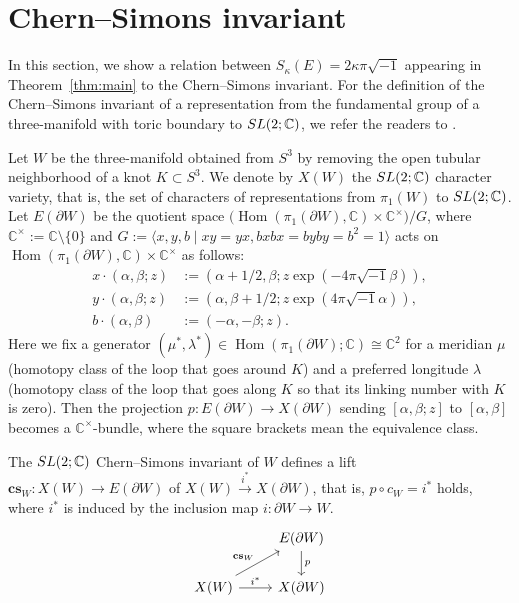 \documentclass[a4paper,dvipdfmx]{amsart}
\theoremstyle{plain}
\theoremstyle{definition}
\theoremstyle{remark}
\newcommand{\C}{\mathbb{C}}
\newcommand{\Hom}{\operatorname{Hom}}
\newcommand{\cs}{\mathbf{cs}}
\newcommand{\SL}{\rm{SL}}
\renewcommand{\i}{\sqrt{-1}}
\numberwithin{equation}{section}
\begin{document}
\section{Chern--Simons invariant}\label{sec:CS}
In this section, we show a relation between $S_{\kappa}(E)=2\kappa\pi\i$ appearing in Theorem~\ref{thm:main} to the Chern--Simons invariant.
For the definition of the Chern--Simons invariant of a representation from the fundamental group of a three-manifold with toric boundary to $\SL(2;\C)$, we refer the readers to \cite{Kirk/Klassen:COMMP1993}.
\par
Let $W$ be the three-manifold obtained from $S^3$ by removing the open tubular neighborhood of a knot $K\subset{S^3}$.
We denote by $X(W)$ the $\SL(2;\C)$ character variety, that is, the set of characters of representations from $\pi_1(W)$ to $\SL(2;\C)$.
Let $E(\partial{W})$ be the quotient space $\bigl(\Hom(\pi_1(\partial{W}),\C)\times\C^{\times}\bigr)/G$, where $\C^{\times}:=\C\setminus\{0\}$ and $G:=\langle x,y,b\mid xy=yx,bxbx=byby=b^2=1\rangle$ acts on $\Hom(\pi_1(\partial{W}),\C)\times\C^{\times}$ as follows:
\begin{equation}\label{eq:G_action}
\begin{split}
  x\cdot(\alpha,\beta;z)
  &:=
  (\alpha+1/2,\beta;z\exp(-4\pi\i\beta)),
  \\
  y\cdot(\alpha,\beta;z)
  &:=
  (\alpha,\beta+1/2;z\exp(4\pi\i\alpha)),
  \\
  b\cdot(\alpha,\beta)
  &:=
  (-\alpha,-\beta;z).
\end{split}
\end{equation}
Here we fix a generator $(\mu^{\ast},\lambda^{\ast})\in\Hom(\pi_1(\partial{W});\C)\cong\C^2$ for a meridian $\mu$ (homotopy class of the loop that goes around $K$) and a preferred longitude $\lambda$ (homotopy class of the loop that goes along $K$ so that its linking number with $K$ is zero).
Then the projection $p\colon E(\partial{W})\to X(\partial{W})$ sending $[\alpha,\beta;z]$ to $[\alpha,\beta]$ becomes a $\C^{\times}$-bundle, where the square brackets mean the equivalence class.
\par
The $\SL(2;\C)$ Chern--Simons invariant of $W$ defines a lift $\cs_{W}\colon X(W)\to E(\partial{W})$ of $X(W)\xrightarrow{i^{\ast}}X(\partial{W})$, that is, $p\circ c_{W}=i^{\ast}$ holds, where $i^{\ast}$ is induced by the inclusion map $i\colon\partial{W}\to W$.
\begin{equation*}
\begin{tikzcd}
                                            &E(\partial{W})\arrow[d,"p"] \\
X(W)\arrow[ru,"\cs_{W}"]\arrow[r,"i^{\ast}"]&X(\partial{W})
\end{tikzcd}
\end{equation*}
\end{document}
